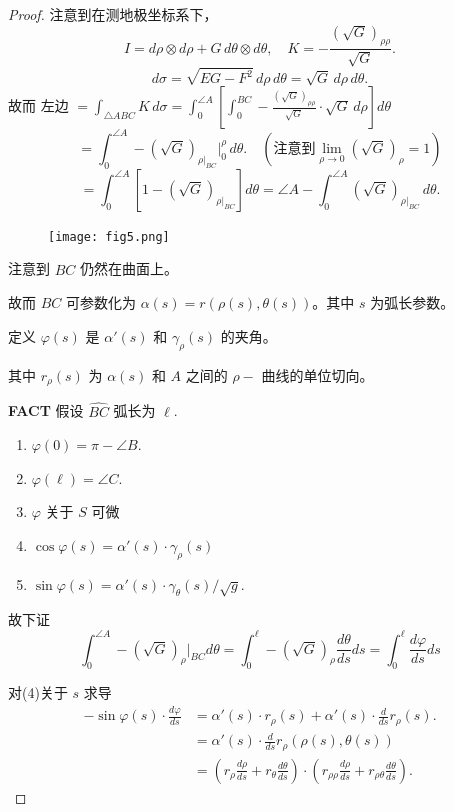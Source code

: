 \documentclass[lang=cn,10pt,thmcnt=section]{elegantbook}
\begin{document}
\begin{proof}
    注意到在测地极坐标系下，
\[
I = d\rho \otimes d\rho + G \, d\theta \otimes d\theta, \quad K = -\frac{(\sqrt{G})_{\rho\rho}}{\sqrt{G}}.
\]
\[
d\sigma = \sqrt{EG - F^2} \, d\rho \, d\theta = \sqrt{G} \, d\rho \, d\theta.
\]
故而 左边 \(= \int_{\triangle ABC} K \, d\sigma = \int_0^{\angle A} \left[ \int_0^{BC} -\frac{(\sqrt{G})_{\rho\rho}}{\sqrt{G}} \cdot \sqrt{G} \, d\rho \right] d\theta\)
\[
= \int_0^{\angle A} -(\sqrt{G})_{\rho \big|_{BC}} \bigg|_0^{\rho} \, d\theta. \quad (\text{注意到} \lim_{\rho \to 0} (\sqrt{G})_{\rho} = 1)
\]
\[
= \int_0^{\angle A} \left[ 1 - (\sqrt{G})_{\rho \big|_{BC}} \right] d\theta = \angle A - \int_0^{\angle A} (\sqrt{G})_{\rho \big|_{BC}} \, d\theta.
\]

\begin{figure} %
    \centering
    \texttt{[image: fig5.png]} %
   \end{figure}

  注意到 $\widehat{BC}$ 仍然在曲面上。

故而 $\widehat{BC}$ 可参数化为 $\alpha(s) = r(\rho(s), \theta(s))$。其中 $s$ 为弧长参数。

定义 $\varphi(s)$ 是 $\alpha'(s)$ 和 $\gamma_\rho(s)$ 的夹角。

其中 $r_\rho(s)$ 为 $\alpha(s)$ 和 $A$ 之间的 $\rho-$ 曲线的单位切向。

\textbf{FACT} 假设 $\widehat{BC}$ 弧长为 $\ell$.

\begin{enumerate}
    \item $\varphi(0) = \pi - \angle B.$
    \item $\varphi(\ell) = \angle C.$
    \item $\varphi$ 关于 $S$ 可微
    \item $\cos \varphi(s) = \alpha'(s) \cdot \gamma_{\rho}(s)$
    \item $\sin \varphi(s) = \alpha'(s) \cdot \gamma_{\theta}(s) / \sqrt{g}.$
\end{enumerate}
故下证
\[
\int_0^{\angle A}   - (\sqrt{G})_{\rho}  \bigg|_{BC} d\theta = \int_0^{\ell} -(\sqrt{G})_ {\rho} \frac{d\theta}{ds} ds = \int_0^{\ell} \frac{d\varphi}{ds} ds \tag{*}
\]

对(4)关于 $s$ 求导
\begin{align*}
    -\sin \varphi(s) \cdot \frac{d\varphi}{ds} &= \alpha'(s) \cdot r_{\rho}(s) + \alpha'(s) \cdot \frac{d}{ds} r_{\rho}(s).\\
    &= \alpha'(s) \cdot \frac{d}{ds} r_{\rho}(\rho(s), \theta(s))\\
    &=\left( r_{\rho} \frac{d\rho}{ds} + r_{\theta} \frac{d\theta}{ds} \right) \cdot \left( r_{\rho\rho} \frac{d\rho}{ds} + r_{\rho\theta} \frac{d\theta}{ds} \right).
\end{align*}



\end{proof}
\end{document}
